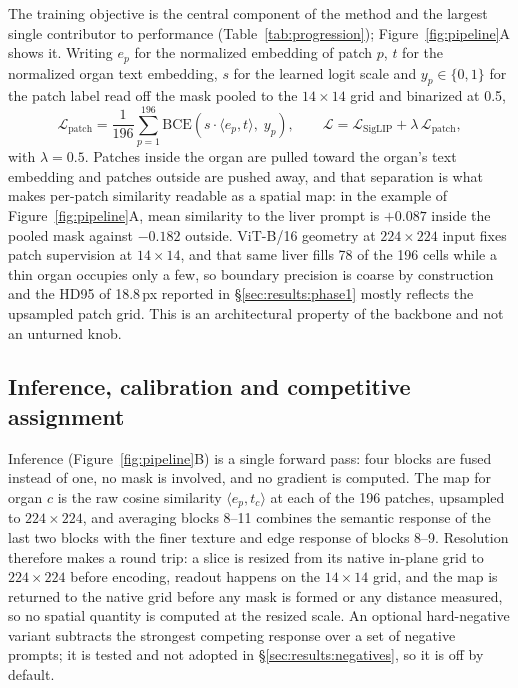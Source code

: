 \documentclass[10pt]{article}
\begin{document}
The training objective is the central component of the method and the largest
single contributor to performance (Table~\ref{tab:progression});
Figure~\ref{fig:pipeline}A shows it. Writing $e_p$ for the normalized embedding of
patch $p$, $t$ for the normalized organ text embedding, $s$ for the learned logit
scale and $y_p\in\{0,1\}$ for the patch label read off the mask pooled to the
$14\times14$ grid and binarized at 0.5,
\begin{equation}
\mathcal{L}_{\text{patch}}
  = \frac{1}{196}\sum_{p=1}^{196}
    \mathrm{BCE}\!\left(s \cdot \langle e_p, t\rangle,\; y_p\right),
\qquad
\mathcal{L} = \mathcal{L}_{\text{SigLIP}} + \lambda\,\mathcal{L}_{\text{patch}},
\end{equation}
with $\lambda = 0.5$. Patches inside the organ are pulled toward the organ's text
embedding and patches outside are pushed away, and that separation is what makes
per-patch similarity readable as a spatial map: in the example of
Figure~\ref{fig:pipeline}A, mean similarity to the liver prompt is $+0.087$
inside the pooled mask against $-0.182$ outside. ViT-B/16 geometry at
$224\times224$ input fixes patch supervision at $14\times14$, and that same liver
fills 78 of the 196 cells while a thin organ occupies only a few, so boundary
precision is coarse by construction and the HD95 of 18.8\,px reported in
\S\ref{sec:results:phase1} mostly reflects the upsampled patch grid. This is an
architectural property of the backbone and not an unturned knob.

\subsection{Inference, calibration and competitive assignment}
\label{sec:methods:inference}

Inference (Figure~\ref{fig:pipeline}B) is a single forward pass: four blocks are
fused instead of one, no mask is involved, and no gradient is computed. The map
for organ $c$ is the raw cosine similarity $\langle e_p, t_c\rangle$ at each of
the 196 patches, upsampled to $224\times224$, and averaging blocks 8--11 combines
the semantic response of the last two blocks with the finer texture and edge
response of blocks 8--9. Resolution therefore makes a round trip: a slice is
resized from its native in-plane grid to $224\times224$ before encoding, readout
happens on the $14\times14$ grid, and the map is returned to the native grid
before any mask is formed or any distance measured, so no spatial quantity is
computed at the resized scale. An optional hard-negative variant subtracts the strongest
competing response over a set of negative prompts; it is tested and not adopted in
\S\ref{sec:results:negatives}, so it is off by default.
\end{document}
